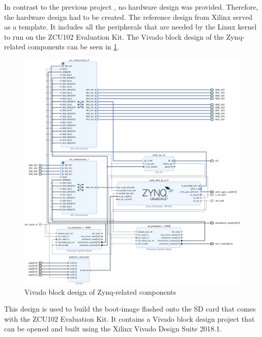 In contrast to the previous project \cite{oldrepo}, no hardware design was provided. Therefore, the hardware design had to be created. The reference design \cite{TRDReferenceDesign} from Xilinx served as a template. It includes all the peripherals that are needed by the Linux kernel to run on the ZCU102 Evaluation Kit. The Vivado block design of the Zynq-related components can be seen in \cref{fig:hwzynq}.

\begin{figure}[htbp]
    \centering
    \includegraphics[width=1\textwidth]{images/hw-design-zynq.png}
    \caption{\label{fig:hwzynq} Vivado block design of Zynq-related components}
\end{figure}

This design is used to build the boot-image flashed onto the SD card that comes with the ZCU102 Evaluation Kit. It contains a Vivado block design project that can be opened and built using
the Xilinx Vivado Design Suite 2018.1.

